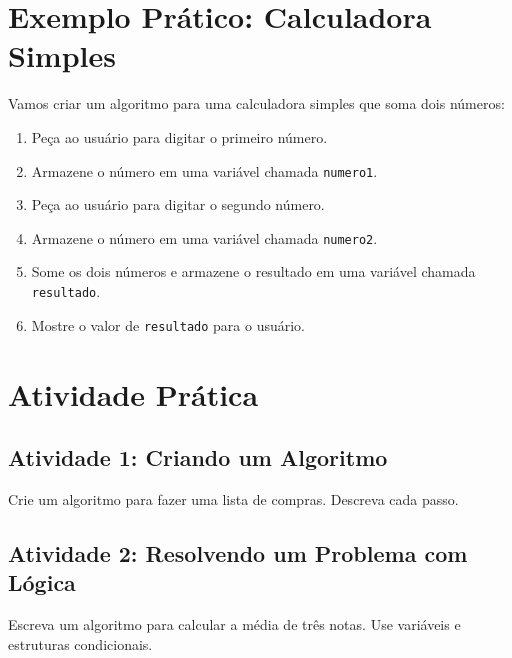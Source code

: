 \documentclass[12pt]{article}
\begin{document}
\begin{multicols}{2}
\section*{Exemplo Prático: Calculadora Simples}

Vamos criar um algoritmo para uma calculadora simples que soma dois números:

\begin{enumerate}
    \item Peça ao usuário para digitar o primeiro número.
    \item Armazene o número em uma variável chamada \texttt{numero1}.
    \item Peça ao usuário para digitar o segundo número.
    \item Armazene o número em uma variável chamada \texttt{numero2}.
    \item Some os dois números e armazene o resultado em uma variável chamada \texttt{resultado}.
    \item Mostre o valor de \texttt{resultado} para o usuário.
\end{enumerate}

\section*{Atividade Prática}

\subsection*{Atividade 1: Criando um Algoritmo}
Crie um algoritmo para fazer uma lista de compras. Descreva cada passo.

\subsection*{Atividade 2: Resolvendo um Problema com Lógica}
Escreva um algoritmo para calcular a média de três notas. Use variáveis e estruturas condicionais.

\end{multicols}
\end{document}
